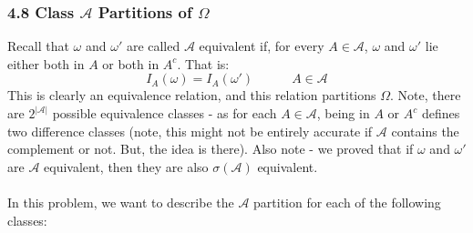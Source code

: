 \documentclass[12pt,a4paper]{article}
\newcommand{\1}[1]{\mathbbm{1}\left\{ #1 \right\}}
\newcommand{\acal}{\mathcal{A}}
\begin{document}
\subsubsection{4.8 Class $\acal$ Partitions of $\Omega$} Recall that $\omega$ and $\omega'$ are called $\acal$ equivalent if, for every $A \in \acal$, $\omega$ and $\omega'$ lie either both in $A$ or both in $A^c$. That is:
$$
	I_A(\omega) = I_A(\omega') \quad\quad\quad A \in \acal
$$
This is clearly an equivalence relation, and this relation partitions $\Omega$. Note, there are $2^{|\acal|}$ possible equivalence classes - as for each $A \in \acal$, being in $A$ or $A^c$ defines two difference classes (note, this might not be entirely accurate if $\acal$ contains the complement or not. But, the idea is there). Also note - we proved that if $\omega$ and $\omega'$ are $\acal$ equivalent, then they are also $\sigma(\acal)$ equivalent.
\\\\
In this problem, we want to describe the $\acal$ partition for each of the following classes:
\end{document}
